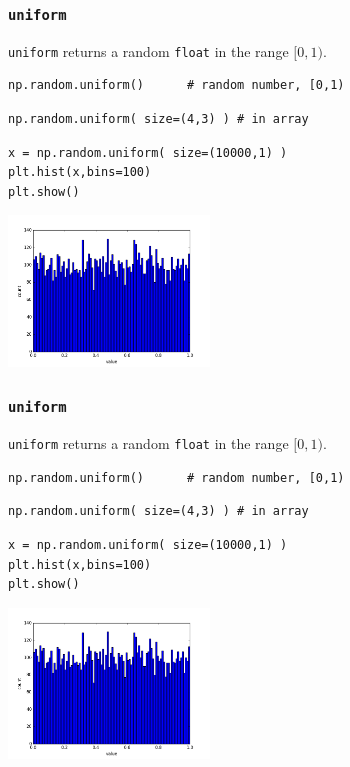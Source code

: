 \documentclass[11pt]{beamer}
\begin{document}
\begin{frame}[fragile]
  \frametitle{\texttt{uniform}}
  \Enlarge

  \begin{enumerate}
  \myitem  \texttt{uniform} returns a random \texttt{float} in the range $[0,1)$.
  \end{enumerate}
  \begin{Verbatim}
np.random.uniform()      # random number, [0,1)
  \end{Verbatim}
  \begin{Verbatim}
np.random.uniform( size=(4,3) ) # in array
  \end{Verbatim}
  \begin{Verbatim}
x = np.random.uniform( size=(10000,1) )
plt.hist(x,bins=100)
plt.show()
  \end{Verbatim}
  \includegraphics[width=0.4\textwidth]{./img/hist-uniform-bins.png}
\end{frame}

\begin{frame}[fragile]
  \frametitle{\texttt{uniform}}
  \Enlarge

  \begin{enumerate}
  \myitem  \texttt{uniform} returns a random \texttt{float} in the range $[0,1)$.
  \end{enumerate}
  \begin{Verbatim}
np.random.uniform()      # random number, [0,1)
  \end{Verbatim}
  \begin{Verbatim}
np.random.uniform( size=(4,3) ) # in array
  \end{Verbatim}
  \begin{Verbatim}
x = np.random.uniform( size=(10000,1) )
plt.hist(x,bins=100)
plt.show()
  \end{Verbatim}
  \includegraphics[width=0.4\textwidth]{./img/hist-uniform-bins.png}
\end{frame}
\end{document}
